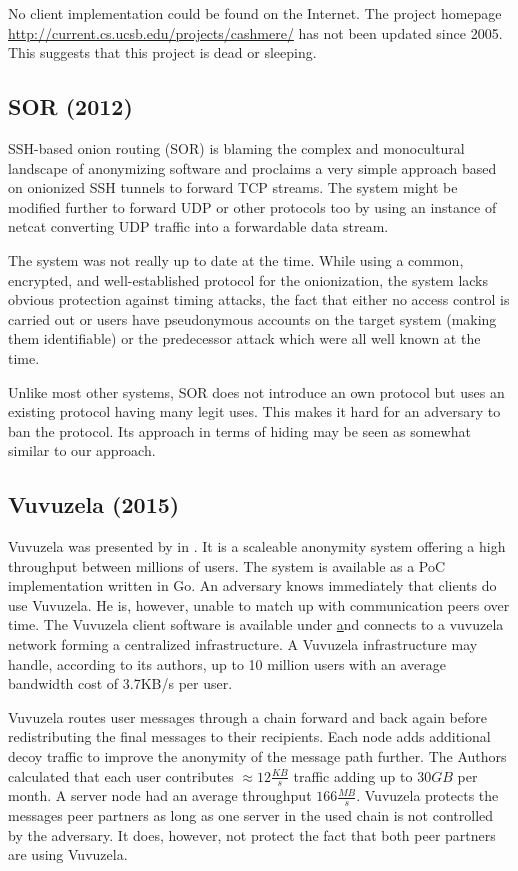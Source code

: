 No client implementation could be found on the Internet. The project homepage \href{http://current.cs.ucsb.edu/projects/cashmere/}{http://current.cs.ucsb.edu/projects/cashmere/} has not been updated since 2005. This suggests that this project is dead or sleeping.

\subsection{SOR (2012)}
SSH-based onion routing (SOR)\cite{Egners_2012} is blaming the complex and monocultural landscape of anonymizing software and proclaims a very simple approach based on onionized SSH tunnels to forward TCP streams. The system might be modified further to forward UDP or other protocols too by using an instance of netcat converting UDP traffic into a forwardable data stream.

The system was not really up to date at the time. While using a common, encrypted, and well-established protocol for the onionization, the system lacks obvious protection against timing attacks, the fact that either no access control is carried out or users have pseudonymous accounts on the target system (making them identifiable) or the predecessor attack\cite{wright2004predecessor} which were all well known at the time.

Unlike most other systems, SOR does not introduce an own protocol but uses an existing protocol having many legit uses. This makes it hard for an adversary to ban the protocol. Its approach in terms of hiding may be seen as somewhat similar to our approach.

\subsection{Vuvuzela (2015)}
Vuvuzela was presented by \citeauthor{van2015vuvuzela} in \cite{van2015vuvuzela}. It is a scaleable anonymity system offering a high throughput between millions of users. The system is available as a PoC implementation written in Go. An adversary knows immediately that clients do use Vuvuzela. He is, however, unable to match up with communication peers over time. The Vuvuzela client software is available under \href{https://vuvuzela.io/} and connects to a vuvuzela network forming a centralized infrastructure. A Vuvuzela infrastructure may handle, according to its authors, up to 10 million users with an average bandwidth cost of 3.7KB/s per user.

Vuvuzela routes user messages through a chain forward and back again before redistributing the final messages to their recipients. Each node adds additional decoy traffic to improve the anonymity of the message path further. The Authors calculated that each user contributes $\approx 12 \frac{KB}{s}$ traffic adding up to $30 GB$ per month. A server node had an average throughput $166 \frac{MB}{s}$. Vuvuzela protects the messages peer partners as long as one server in the used chain is not controlled by the adversary. It does, however, not protect the fact that both peer partners are using Vuvuzela. 

